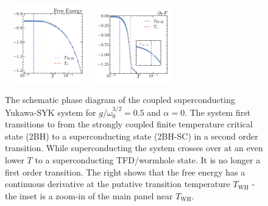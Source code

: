 \begin{figure}[t!]
    \centering
    ~\includegraphics[width=0.3\textwidth]{figures/chapter3/SUP_free_energy.pdf}
    ~\includegraphics[width=0.3\textwidth]{figures/chapter3/partialTFSUP.pdf}
    \caption{The schematic phase diagram of the coupled superconducting Yukawa-SYK system for $g/\omega_0^{3/2}=0.5$ and $\alpha=0$. The system first transitions to from the strongly coupled finite temperature critical state (2BH) to a superconducting state (2BH-SC) in a second order transition. While superconducting the system 
    crosses over at an even lower $T$ to a superconducting TFD/wormhole state. It is no longer a first order transition.  The right shows that the free energy  has a continuous derivative at the putative transition temperature $T_{\text{WH}}$ - the inset is a zoom-in of the main panel near $T_{\text{WH}}$. 
    }
    \label{fig:FreeEnergySupCondState}
\end{figure}

